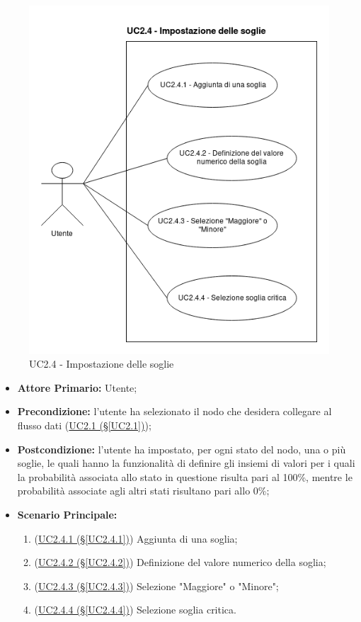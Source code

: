 \begin{figure}[H]
\centering
\includegraphics[scale=0.5]{./images/UC2-4.png}
\caption{UC2.4 - Impostazione delle soglie}
\end{figure}

\begin{itemize}
\item \textbf{Attore Primario:} Utente;
\item \textbf{Precondizione:} l'utente ha selezionato il nodo che desidera collegare al flusso dati 					(\hyperref[UC2.1]{UC2.1 (§\ref*{UC2.1})});
\item \textbf{Postcondizione:} l'utente ha impostato, per ogni stato del nodo, una o più soglie, le quali hanno la funzionalità di definire gli insiemi di valori per i quali la probabilità associata allo stato in questione risulta pari al 100\%, mentre le probabilità associate agli altri stati risultano pari allo 0\%;
\item \textbf{Scenario Principale:}
	\begin{enumerate}
	\item (\hyperref[UC2.4.1]{UC2.4.1 (§\ref*{UC2.4.1})}) Aggiunta di una soglia;
	\item (\hyperref[UC2.4.2]{UC2.4.2 (§\ref*{UC2.4.2})}) Definizione del valore numerico della soglia;
	\item (\hyperref[UC2.4.3]{UC2.4.3 (§\ref*{UC2.4.3})}) Selezione "Maggiore" o "Minore";
	\item (\hyperref[UC2.4.4]{UC2.4.4 (§\ref*{UC2.4.4})}) Selezione soglia critica.
	\end{enumerate}
\end{itemize}

